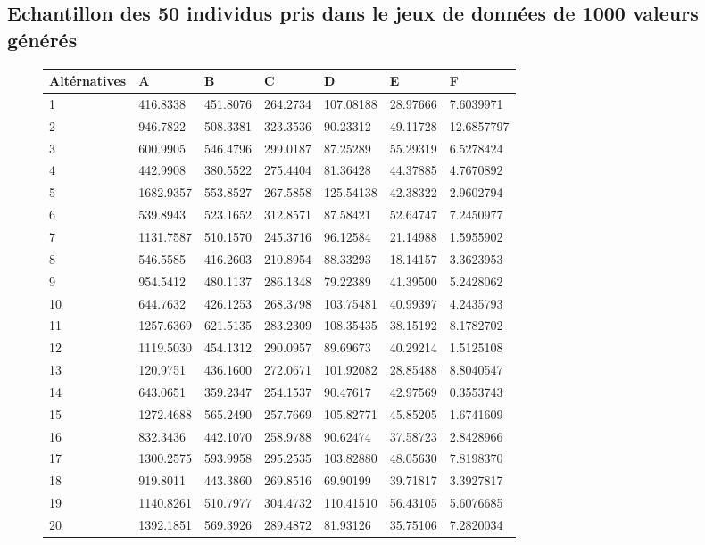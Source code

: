 \documentclass[a4paper]{article}
\begin{document}
\begin{appendices}
\newpage
\section{Echantillon des 50 individus pris dans le jeux de données de 1000 valeurs générés}
\begin{figure}[H]
\begin{tabular}{lllllll}
  \hline
Altérnatives&  A&B& C&D&E&F \\
  \hline
1   &416.8338 &451.8076 &264.2734 &107.08188 &28.97666  &7.6039971\\
2   &946.7822 &508.3381 &323.3536  &90.23312 &49.11728 &12.6857797\\
3   &600.9905 &546.4796 &299.0187  &87.25289 &55.29319  &6.5278424\\
4   &442.9908 &380.5522 &275.4404  &81.36428 &44.37885  &4.7670892\\
5  &1682.9357 &553.8527 &267.5858 &125.54138 &42.38322 & 2.9602794\\
6   &539.8943 &523.1652 &312.8571  &87.58421 &52.64747  &7.2450977\\
7  &1131.7587 &510.1570 &245.3716  &96.12584& 21.14988 &1.5955902\\
8   &546.5585 &416.2603 &210.8954  &88.33293 &18.14157  &3.3623953\\
9   &954.5412 &480.1137 &286.1348  &79.22389 &41.39500  &5.2428062\\
10  &644.7632 &426.1253 &268.3798 &103.75481& 40.99397  &4.2435793\\
11 &1257.6369 &621.5135 &283.2309 &108.35435 &38.15192  &8.1782702\\
12 &1119.5030 &454.1312 &290.0957 & 89.69673 &40.29214  &1.5125108\\
13  &120.9751 &436.1600 &272.0671 &101.92082 &28.85488  &8.8040547\\
14  &643.0651 &359.2347 &254.1537  &90.47617 &42.97569  &0.3553743\\
15 &1272.4688 &565.2490 &257.7669 &105.82771 &45.85205  &1.6741609\\
16  &832.3436 &442.1070 &258.9788  &90.62474 &37.58723  &2.8428966\\
17 &1300.2575 &593.9958 &295.2535 &103.82880 &48.05630  &7.8198370\\
18  &919.8011 &443.3860 &269.8516  &69.90199 &39.71817  &3.3927817\\
19 &1140.8261 &510.7977 &304.4732 &110.41510 &56.43105 & 5.6076685\\
20 &1392.1851 &569.3926 &289.4872  &81.93126 &35.75106  &7.2820034\\

\end{tabular}
\end{figure}
\end{appendices}
\end{document}
